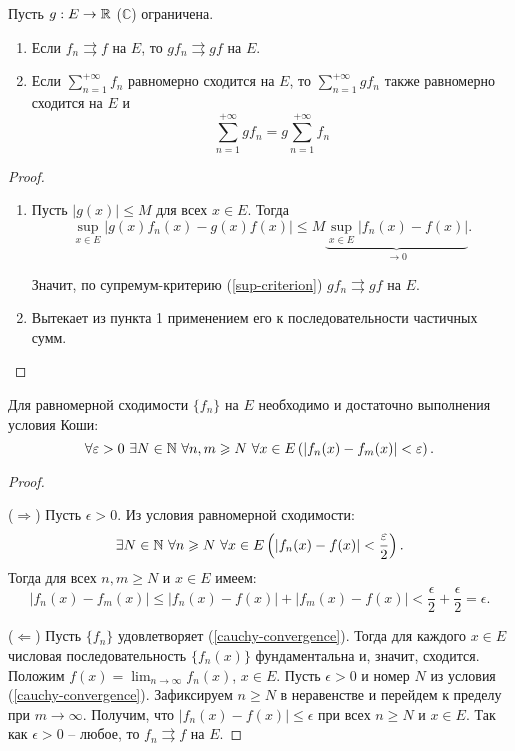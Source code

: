\begin{property}
    Пусть $g : E \rightarrow \mathbb{R}$ ($\mathbb{C}$) ограничена.

    \begin{enumerate}
        \item Если $f_n \rightrightarrows f$ на $E$, то $gf_n \rightrightarrows gf$ на $E$.

        \item Если $\sum_{n = 1}^{+\infty} f_n$ равномерно сходится на $E$, то $\sum_{n = 1}^{+\infty} gf_n$ также равномерно сходится на $E$ и
            \[
                \sum_{n = 1}^{+\infty} gf_n = g\sum_{n = 1}^{+\infty} f_n
            \]
    \end{enumerate}

    \begin{proof}~
    
        \begin{enumerate}
            \item Пусть $|g(x)| \le M$ для всех $x \in E$. Тогда 
            \[
                \sup_{x \in E} |g(x)f_n(x) - g(x)f(x)| \le M \underbrace{\sup_{x \in E}|f_n(x) - f(x)|}_{\to 0}.
            \]
    
            Значит, по супремум-критерию (\ref{sup-criterion}) $gf_{n} \rightrightarrows gf$ на $E$.
            
            \item Вытекает из пункта 1 применением его к последовательности частичных сумм.
        \end{enumerate}
    \end{proof}
\end{property}

\begin{theorem}
    Для равномерной сходимости $\{f_{n}\}$ на $E$ необходимо и достаточно выполнения условия Коши:
    \label{cauchy-convergence}
    \[\forall \epsilon > 0 \ \exists N \in \N \ \forall n, m \geq N \ \forall x \in E \left(\left|f_{n}(x) - f_{m}(x)\right| < \epsilon\right).\]
\end{theorem}

\begin{proof}~

    ($\Rightarrow$) Пусть $\epsilon > 0$. Из условия равномерной сходимости:
    \[\exists N \in \mathbb{N} \ \forall n \geqslant N \ \forall x \in E \left(\left|f_{n}(x) - f(x)\right| < \frac{\varepsilon}{2}\right).\]
    Тогда для всех $n, m \geq N$ и $x \in E$ имеем:
    \[\left|f_{n}(x) - f_{m}(x)\right| \leq |f_{n}(x) - f(x)| + |f_{m}(x) - f(x)| < \frac{\epsilon}{2} + \frac{\epsilon}{2} = \epsilon.\]
    
    ($\Leftarrow$) Пусть $\{f_{n}\}$ удовлетворяет (\ref{cauchy-convergence}). Тогда для каждого $x \in E$ числовая последовательность $\{f_{n}(x)\}$ фундаментальна и, значит, сходится. Положим $f(x) = \lim_{n \to \infty} f_{n}(x)$, $x \in E$. Пусть $\epsilon > 0$ и номер $N$ из условия (\ref{cauchy-convergence}). Зафиксируем $n \geq N$ в неравенстве и перейдем к пределу при $m \to \infty$. Получим, что $|f_{n}(x) - f(x)| \leq \epsilon$ при всех $n \geq N$ и $x \in E$. Так как $\epsilon > 0$ -- любое, то $f_{n} \rightrightarrows f$ на $E$.
\end{proof}


